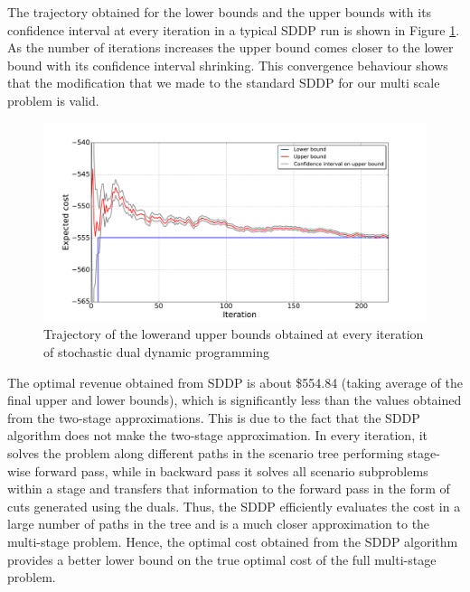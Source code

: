 \documentclass[11pt,twoside]{article}
\begin{document}
The trajectory obtained for the lower bounds and the upper bounds with its confidence interval at every iteration in a typical SDDP run is shown in Figure \ref{fig:bounds}. As the number of iterations increases the upper bound comes closer to the lower bound with its confidence interval shrinking. This convergence behaviour shows that the modification that we made to the standard SDDP for our multi scale problem is valid. 
\begin{figure}[h!]
\begin{center}
\includegraphics[scale=0.4]
{Figures/Plots/dualdynamic/bounds.pdf} \caption{Trajectory of the lowerand upper bounds obtained at every iteration of stochastic dual dynamic programming}\label{fig:bounds}
\end{center}
\end{figure}
\FloatBarrier
The optimal revenue obtained from SDDP is about \$554.84 (taking average of the final upper and lower bounds), which is significantly less than the values obtained from the two-stage approximations. This is due to the fact that the SDDP algorithm does not make the two-stage approximation. In every iteration, it solves the problem along different paths in the scenario tree performing stage-wise forward pass, while in backward pass it solves all scenario subproblems within a stage and transfers that information to the forward pass in the form of cuts generated using the duals. Thus, the SDDP efficiently evaluates the cost in a large number of paths in the tree and is a much closer approximation to the multi-stage problem. Hence, the optimal cost obtained from the SDDP algorithm provides a better lower bound on the true optimal cost of the full multi-stage problem.

\FloatBarrier
\end{document}
